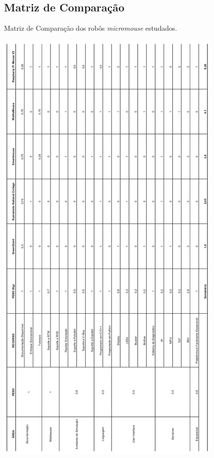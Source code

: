 \subsection{Matriz de Comparação}

\begin{table}[H]
	\centering
	\caption{Matriz de Comparação dos robôs \textit{micromouse }estudados.}
	\includegraphics[width=110mm]
	{Figures/MatrizComp_v.png}
	\label{tab:MatrizComp}
\end{table}